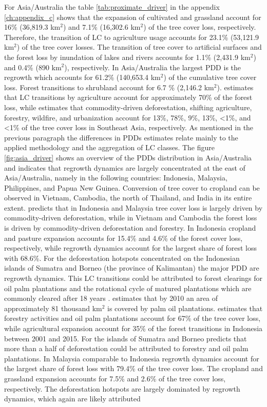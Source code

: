 			For Asia/Australia the table \ref{tab:proximate_driver} in the appendix \ref{ch:appendix_c} shows that the expansion of cultivated and grassland account for 16\% (36,819.3 km$^2$) and 7.1\% (16,302.6 km$^2$) of the tree cover loss, respectively. Therefore, the transition of \ac{LC} to agriculture usage accounts for 23.1\% (53,121.9 km$^2$) of the tree cover losses. The transition of tree cover to artificial surfaces and the forest loss by inundation of lakes and rivers accounts for 1.1\% (2,431.9 km$^2$) and 0.4\% (890 km$^2$), respectively. In Asia/Australia the largest \ac{PDD} is the regrowth which accounts for 61.2\% (140,653.4 km$^2$) of the cumulative tree cover loss. Forest transitions to shrubland account for 6.7 \% (2,146.2 km$^2$). \citet{Hosonuma2012} estimates that \ac{LC} transitions by agriculture account for approximately 70\% of the forest loss, while \citet{Curtis2018} estimates that commodity-driven deforestation, shifting agriculture, forestry, wildfire, and urbanization account for 13\%, 78\%, 9\%, 13\%, <1\%, and <1\% of the tree cover loss in Southeast Asia, respectively. As mentioned in the previous paragraph the differences in \acp{PDD} estimates relate mainly to the applied methodology and the aggregation of \ac{LC} classes. The figure \ref{fig:asia_driver} shows an overview of the \acp{PDD} distribution in Asia/Australia and indicates that regrowth dynamics are largely concentrated at the east of Asia/Australia, namely in the following countries: Indonesia, Malaysia, Philippines, and Papua New Guinea. Conversion of tree cover to cropland can be observed in Vietnam, Cambodia, the north of Thailand, and India in its entire extent. \citet{Curtis2018} predicts that in Indonesia and Malaysia tree cover loss is largely driven by commodity-driven deforestation, while in Vietnam and Cambodia the forest loss is driven by commodity-driven deforestation and forestry. In Indonesia cropland and pasture expansion accounts for 15.4\% and 4.6\% of the forest cover loss, respectively, while regrowth dynamics account for the largest share of forest loss with 68.6\%. For the deforestation hotspots concentrated on the Indonesian islands of Sumatra and Borneo (the province of Kalimantan) the major \ac{PDD} are regrowth dynamics. This \ac{LC} transitions could be attributed to forest clearings for oil palm plantations and the rotational cycle of matured plantations which are commonly cleared after 18 years \citep{Corley2016}. \citet{Corley2016} estimates that by 2010 an area of approximately 81 thousand km$^2$ is covered by palm oil plantations. \citet{Austin2019} estimates that forestry activities and oil palm plantations account for 67\% of the tree cover loss, while agricultural expansion account for 35\% of the forest transitions in Indonesia between 2001 and 2015. For the islands of Sumatra and Borneo \citet{Austin2019} predicts that more than a half of deforestation could be attributed to forestry and oil palm plantations. In Malaysia comparable to Indonesia regrowth dynamics account for the largest share of forest loss with 79.4\% of the tree cover loss. The cropland and grassland expansion accounts for 7.5\% and 2.6\% of the tree cover loss, respectively. The deforestation hotspots are largely dominated by regrowth dynamics, which again are likely attributed 